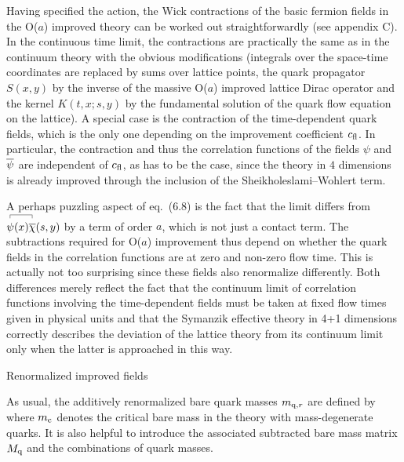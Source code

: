 Having specified the action,
the Wick contractions
of the basic fermion fields in the O($a$) improved theory
can be worked out straightforwardly 
(see appendix C).
In the continuous time limit, the contractions 
are practically the same
as in the continuum theory with the obvious modifications
(integrals over the space-time coordinates are replaced by
sums over lattice points, the quark propagator $S(x,y)$
by the inverse of the massive O($a$) improved lattice Dirac operator
and the kernel $K(t,x;s,y)$ by the fundamental solution of the 
quark flow equation on the lattice).
A special case is the contraction
of the time-dependent quark fields, which is the only one
depending on the improvement coefficient $c_{\rm fl}$.
In particular, the contraction and thus the correlation functions
of the fields $\psi$ and $\overline{\psi}$ are independent of $c_{\rm fl}$, as has to be
the case, since the theory in $4$ dimensions is already improved
through the inclusion of the Sheikholeslami--Wohlert term.

A perhaps puzzling aspect of eq.~(6.8) is the fact that the limit
differs from $\wick{\psi(x)\chibar(s,y)}$ by a 
term of order $a$, which is not just a contact term.
The subtractions required for
O($a$) improvement thus depend on whether the quark fields
in the correlation functions are at zero and 
non-zero flow time. This is actually not too surprising
since these fields also renormalize differently.
Both differences merely reflect the fact that 
the continuum limit of correlation
functions involving the time-dependent fields 
must be taken at fixed flow times given in physical units
and that the Symanzik effective theory in 4+1 dimensions
correctly describes the deviation of the lattice theory
from its continuum limit only when the latter is approached 
in this way.


 Renormalized improved fields

As usual, the additively renormalized bare quark masses 
$m_{{\rm q},r}$ are defined by
where $m_{\rm c}$ denotes the critical bare mass in the theory 
with mass-degenerate quarks.
It is also helpful to introduce
the associated subtracted bare mass matrix $M_{\rm q}$ and the combinations
of quark masses.


